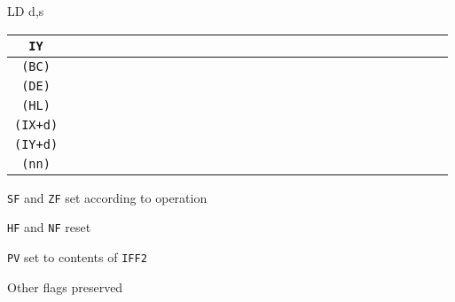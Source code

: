 \documentclass[twoside,openright,a4paper]{book}
\begin{document}
\begin{basedescript}{
	\desclabelstyle{\multilinelabel}
	\desclabelwidth{3cm}}
\begin{detailitem}{LD d,s}
{\begin{tabular}{@{}|c|c|c|c|c|c|c|c|c|c|c|c|c|c|c|c|c|c|c|c|c|c|c|c|c|c|c|c|}
				{\tt IY}     &\n&\n&\n&\n&\n&\n&\n&\n&\n&\n&\n&\n&\n&\n&\n&\n&\n&\n&\n&\n&\n&\n&\n&\n&\n&\X&\X \\ \hline
				{\tt (BC)}   &\X&\n&\n&\n&\n&\n&\n&\n&\n&\n&\n&\n&\n&\n&\n&\n&\n&\n&\n&\n&\n&\n&\n&\n&\n&\n&\n \\ \hline
				{\tt (DE)}   &\X&\n&\n&\n&\n&\n&\n&\n&\n&\n&\n&\n&\n&\n&\n&\n&\n&\n&\n&\n&\n&\n&\n&\n&\n&\n&\n \\ \hline
				{\tt (HL)}   &\X&\X&\X&\X&\X&\X&\X&\n&\n&\n&\n&\n&\n&\n&\n&\n&\n&\n&\n&\n&\n&\n&\n&\n&\n&\n&\n \\ \hline
				{\tt (IX+d)} &\X&\X&\X&\X&\X&\X&\X&\n&\n&\n&\n&\n&\n&\n&\n&\n&\n&\n&\n&\n&\n&\n&\n&\n&\n&\n&\n \\ \hline
				{\tt (IY+d)} &\X&\X&\X&\X&\X&\X&\X&\n&\n&\n&\n&\n&\n&\n&\n&\n&\n&\n&\n&\n&\n&\n&\n&\n&\n&\n&\n \\ \hline
				{\tt (nn)}   &\X&\n&\n&\n&\n&\n&\n&\n&\n&\n&\n&\n&\n&\X&\X&\X&\X&\X&\X&\n&\n&\n&\n&\n&\n&\n&\n \\ \hline
			\end{tabular}
		}

		\pagebreak
		\begin{DetailEffects}
			\item {\tt SF} and {\tt ZF} set according to operation
			\item {\tt HF} and {\tt NF} reset
			\item {\tt PV} set to contents of {\tt IFF2}
			\item Other flags preserved
		\end{DetailEffects}
						
		\begin{DetailTiming}
		\end{DetailTiming}

	\end{detailitem}


\end{basedescript}
\end{document}
